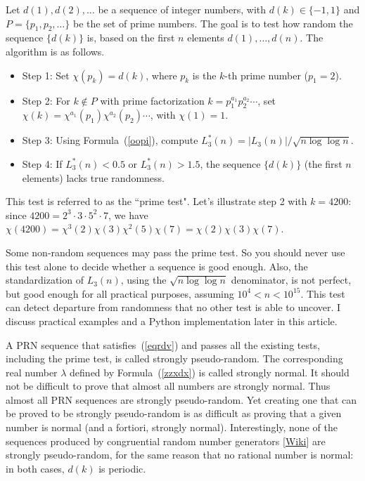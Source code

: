 \documentclass[oneside,10pt]{book}
\begin{document}
Let $d(1),d(2),\dots$ be a sequence of integer numbers, with $d(k)\in \{-1,1\}$ and
$P=\{p_1,p_2,\dots\}$ be the set of prime numbers. The goal is to test how random the sequence $\{d(k)\}$ is, based on the first $n$ elements $d(1),\dots,d(n)$. The algorithm is as follows.
\begin{itemize}
\item Step 1: Set $\chi(p_k)=d(k)$, where $p_k$ is the $k$-th prime number ($p_1=2$).
\item Step 2: For $k\notin P$ with
 prime factorization $k=p_1^{a_1}p_2^{a_2}\cdots$, set
$\chi(k)=\chi^{a_1}(p_1)\chi^{a_2}(p_2)\cdots$, with $\chi(1)=1.$
\item Step 3: Using Formula~(\ref{oopi}), compute $L^*_3(n) = |L_3(n)|/\sqrt{n\log\log n}$.
\item Step 4: If $L^*_3(n)<0.5$ or $L^*_3(n)>1.5$, the sequence $\{d(k)\}$ (the first $n$ elements) lacks true randomness.
\end{itemize}
This test is referred to as the ``\textcolor{index}{prime test}".
Let's illustrate step 2 with $k=4200$: since $4200=2^3\cdot 3\cdot 5^2 \cdot 7$, we have $\chi(4200)=\chi^3(2)\chi(3)\chi^2(5)\chi(7)
 = \chi(2)\chi(3)\chi(7)$.

Some non-random sequences may pass the prime test. So you should never use this test alone to decide whether a sequence is good enough.
 Also, the standardization of $L_3(n)$, using the $\sqrt{n\log\log n}$ denominator, is not perfect, but good enough for all practical purposes, assuming $10^4<n<10^{15}$.  This test can detect departure from randomness that no other test is able to uncover.
I discuss practical examples and
 a Python implementation later in this article.

A PRN sequence that satisfies~(\ref{eqrdv}) and passes all the existing tests, including the prime test, is called \textcolor{index}{strongly pseudo-random}. The
corresponding real number $\lambda$ defined by Formula~(\ref{zzxdx}) is called \textcolor{index}{strongly normal}. It should not be difficult to
prove that almost all numbers are strongly normal. Thus almost all PRN sequences are strongly pseudo-random. Yet creating
one that can be proved to be strongly pseudo-random is as difficult as proving that a given number is normal (and a fortiori, strongly normal). Interestingly, none of the sequences produced by \textcolor{index}{congruential random number generators}
[\href{https://en.wikipedia.org/wiki/Linear_congruential_generator}{Wiki}] are strongly pseudo-random,
for the same reason that no rational number is normal: in both cases, $d(k)$ is periodic.
\end{document}

